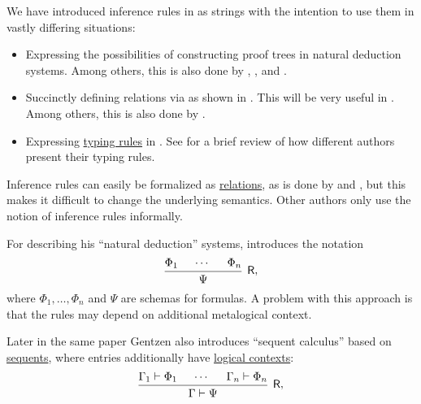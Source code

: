\begin{remark}\label{rem:inference_rules_semantics}
  We have introduced inference rules in  as strings with the intention to use them in vastly differing situations:
  \begin{itemize}
    \item Expressing the possibilities of constructing proof trees in natural deduction systems. Among others, this is also done by , ,  and .
    \item Succinctly defining relations via  as shown in . This will be very useful in . Among others, this is also done by .
    \item Expressing \hyperref[con:typing_rule]{typing rules} in . See  for a brief review of how different authors present their typing rules.
  \end{itemize}

  Inference rules can easily be formalized as \hyperref[def:relation]{relations}, as is done by  and , but this makes it difficult to change the underlying semantics. Other authors only use the notion of inference rules informally.

  For describing his \enquote{natural deduction} systems,  introduces the notation
  \begin{equation*}
    \begin{prooftree}
      \hypo{ \Phi_1 }
      \hypo{ \cdots }
      \hypo{ \Phi_n }
      \infer3[\logic{R}]{ \Psi }
    \end{prooftree},
  \end{equation*}
  where \( \Phi_1, \ldots, \Phi_n \) and \( \Psi \) are schemas for formulas. A problem with this approach is that the rules may depend on additional metalogical context.

  Later in the same paper Gentzen also introduces \enquote{sequent calculus} based on \hyperref[def:sequent]{sequents}, where entries additionally have \hyperref[def:logical_context]{logical contexts}:
  \begin{equation*}
    \begin{prooftree}
      \hypo{ \Gamma_1 \vdash \Phi_1 }
      \hypo{ \cdots }
      \hypo{ \Gamma_n \vdash \Phi_n }
      \infer3[\logic{R}]{ \Gamma \vdash \Psi }
    \end{prooftree},
  \end{equation*}


\end{remark}
